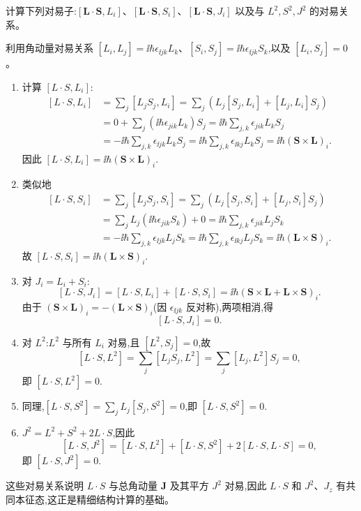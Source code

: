 \begin{question}
计算下列对易子:$[\mathbf L\cdot\mathbf S,L_i]$、$[\mathbf L\cdot\mathbf S,S_i]$、$[\mathbf L\cdot\mathbf S,J_i]$ 以及与 $L^2,S^2,J^2$ 的对易关系。
\end{question}
\begin{solution}
利用角动量对易关系 $[L_i,L_j]=\ii\hbar\epsilon_{\ii jk}L_k$、$[S_i,S_j]=\ii\hbar\epsilon_{\ii jk}S_k$,以及 $[L_i,S_j]=0$。

\begin{enumerate}
\item 计算 $[L\cdot S,L_i]$:
\[
\begin{aligned}
[L\cdot S,L_i]&=\sum_j[L_jS_j,L_i]
=\sum_j\left(L_j[S_j,L_i]+[L_j,L_i]S_j\right) \\
&=0+\sum_j(\ii\hbar\epsilon_{jik}L_k)S_j
=\ii\hbar\sum_{j,k}\epsilon_{jik}L_kS_j \\
&=-\ii\hbar\sum_{j,k}\epsilon_{\ii jk}L_kS_j
=\ii\hbar\sum_{j,k}\epsilon_{\ii kj}L_kS_j
=\ii\hbar(\mathbf S\times\mathbf L)_i.
\end{aligned}
\]
因此 $\boxed{[L\cdot S,L_i]=\ii\hbar(\mathbf S\times\mathbf L)_i.}$

\item 类似地
\[
\begin{aligned}
[L\cdot S,S_i]&=\sum_j[L_jS_j,S_i]
=\sum_j\left(L_j[S_j,S_i]+[L_j,S_i]S_j\right)\\
&=\sum_j L_j(\ii\hbar\epsilon_{jik}S_k)+0
=\ii\hbar\sum_{j,k}\epsilon_{jik}L_jS_k\\
&=-\ii\hbar\sum_{j,k}\epsilon_{\ii jk}L_jS_k
=\ii\hbar\sum_{j,k}\epsilon_{\ii kj}L_jS_k
=\ii\hbar(\mathbf L\times\mathbf S)_i.
\end{aligned}
\]
故 $\boxed{[L\cdot S,S_i]=\ii\hbar(\mathbf L\times\mathbf S)_i.}$

\item 对 $J_i=L_i+S_i$:
\[
[L\cdot S,J_i]=[L\cdot S,L_i]+[L\cdot S,S_i]
=\ii\hbar(\mathbf S\times\mathbf L+\mathbf L\times\mathbf S)_i.
\]
由于 $(\mathbf S\times\mathbf L)_i=-(\mathbf L\times\mathbf S)_i$(因 $\epsilon_{\ii jk}$ 反对称),两项相消,得
\[
\boxed{[L\cdot S,J_i]=0.}
\]

\item 对 $L^2$:$L^2$ 与所有 $L_i$ 对易,且 $[L^2,S_j]=0$,故
\[
[L\cdot S,L^2]=\sum_j[L_jS_j,L^2]=\sum_j[L_j,L^2]S_j=0,
\]
即 $\boxed{[L\cdot S,L^2]=0.}$

\item 同理,$[L\cdot S,S^2]=\sum_j L_j[S_j,S^2]=0$,即 $\boxed{[L\cdot S,S^2]=0.}$

\item $J^2=L^2+S^2+2L\cdot S$,因此
\[
[L\cdot S,J^2]=[L\cdot S,L^2]+[L\cdot S,S^2]+2[L\cdot S,L\cdot S]=0,
\]
即 $\boxed{[L\cdot S,J^2]=0.}$
\end{enumerate}

这些对易关系说明 $L\cdot S$ 与总角动量 $\mathbf J$ 及其平方 $J^2$ 对易,因此 $L\cdot S$ 和 $J^2$、$J_z$ 有共同本征态,这正是精细结构计算的基础。
\end{solution}

